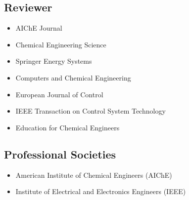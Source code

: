 \documentclass[10pt]{article}
\begin{document}

\subsection{Reviewer}
\begin{itemize}[nosep]
\item AIChE Journal
\item Chemical Engineering Science
\item Springer Energy Systems
\item Computers and Chemical Engineering
\item European Journal of Control
\item IEEE Transaction on Control System Technology
\item Education for Chemical Engineers
\end{itemize}


\subsection{Professional Societies}
\begin{itemize}[nosep]
\item American Institute of Chemical Engineers (AIChE)
\item Institute of Electrical and Electronics Engineers (IEEE)
\end{itemize}
\end{document}
